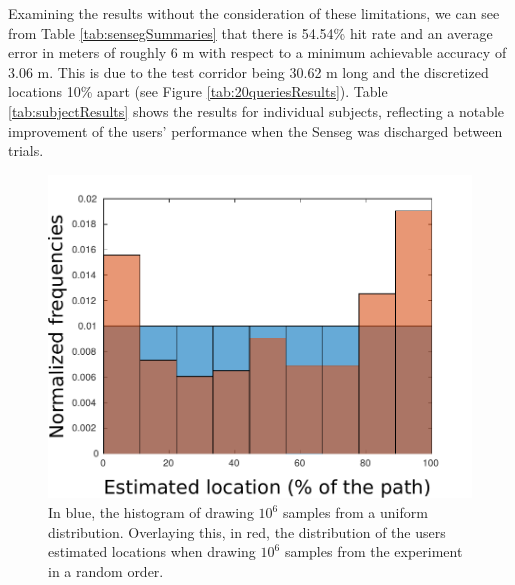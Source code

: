   
Examining the results without the consideration of these limitations, we can see from Table \ref{tab:sensegSummaries} that there is 54.54\% hit rate and an average error in meters of roughly 6 m with respect to a minimum achievable accuracy of 3.06 m. This is due to the test corridor being 30.62 m long and the discretized locations 10\% apart (see Figure \ref{tab:20queriesResults}). Table \ref{tab:subjectResults} shows the results for individual subjects, reflecting a notable improvement of the users' performance when the Senseg was discharged between trials.

\begin{figure}[h]
    \centering
    \includegraphics[width=.7\textwidth]{gfx/Chapter06/barplot_rand.pdf}%
    \caption{In blue, the histogram of drawing $10^6$ samples from a uniform distribution. Overlaying this, in red, the distribution of the users estimated locations when drawing $10^6$ samples from the experiment in a random order.}   
\end{figure}



